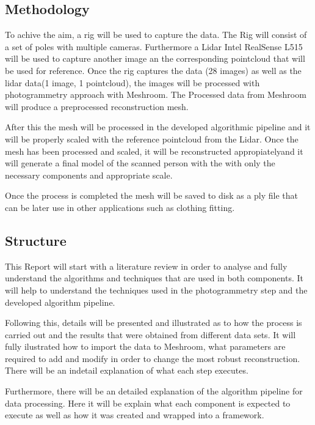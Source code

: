 \documentclass[12pt]{report}
\begin{document}
\subsection{Methodology}
To achive the aim, a rig will be used to capture the data. The Rig will consist of a set of poles with multiple cameras. Furthermore a Lidar Intel RealSense L515 will be used to capture another image an the corresponding pointcloud that will be used for reference.
Once the rig captures the data (28 images) as well as the lidar data(1 image, 1 pointcloud), the images will be processed with photogrammetry approach with Meshroom. 
The Processed data from Meshroom will produce a preprocessed reconstruction mesh. 

After this the mesh will be processed in the developed algorithmic pipeline and it will be properly scaled with the reference pointcloud from the Lidar. 
Once the mesh has been processed and scaled, it will be reconstructed appropiatelyand it will generate a final model of the scanned person with the with only the necessary components and appropriate scale.

Once the process is completed the mesh will be saved to disk as a ply file that can be later use in other applications such as clothing fitting. 

\subsection{Structure}
This Report will start with a literature review in order to analyse and fully understand the algorithms and techniques that are used in both components. 
It will help to understand the techniques used in the photogrammetry step and the developed algorithm pipeline.

Following this, details will be presented and illustrated as to how the process is carried out and the results that were obtained from different data sets.
It will fully ilustrated how to import the data to Meshroom, what parameters are required to add and modify in order to change the most robust reconstruction. There will be an indetail explanation of what each step executes.

Furthermore, there will be an detailed explanation of the algorithm pipeline for data processing. Here it will be explain what each component is expected to execute as well as how it was created and wrapped into a framework.
\enlargethispage{\baselineskip}
\end{document}
